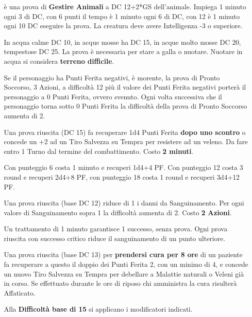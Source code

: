 \documentclass[landscape,10pt,a4paper]{article}
\begin{document}
\begin{multicols}{3}
\begin{dmbox}[title=Gestire Animali - Ammansire un animale]
è una prova di \textbf{Gestire Animali} a DC 12+2*GS dell'animale. Impiega 1 minuto ogni 3 di DC, con 6 punti il tempo è 1 minuto ogni 6 di DC, con 12 è 1 minuto ogni 10 DC eseguire la prova. La creatura deve avere Intelligenza -3 o superiore.
\end{dmbox}		

\begin{dmbox}[title=Nuotare]
In acqua calme DC 10, in acque mosse ha DC 15, in acque molto mosse DC 20, tempestose DC 25. La prova è necessaria per stare a galla o nuotare. Nuotare in acqua si considera \textbf{terreno difficile}.
\end{dmbox}		

\begin{dmbox}[title=Pronto Soccorso]
Se il personaggio ha Punti Ferita negativi, è morente, la prova di Pronto Soccorso, 3 Azioni, a difficoltà 12 più il valore dei Punti Ferita negativi porterà il personaggio a 0 Punti Ferita, ovvero svenuto. Ogni volta successiva che il personaggio torna sotto 0 Punti Ferita la difficoltà della prova di Pronto Soccorso aumenta di 2.

Una prova riuscita (DC 15) fa recuperare 1d4 Punti Ferita \textbf{dopo uno scontro} o concede un +2 ad un Tiro Salvezza su Tempra per resistere ad un veleno. Da fare entro 1 Turno dal termine del combattimento.  Costo \textbf{2 minuti}.

Con punteggio 6 costa 1 minuto e recuperi 1d4+4 PF. Con punteggio 12 costa 3 round e recuperi 2d4+8 PF, con punteggio 18 costa 1 round e recuperi 3d4+12 PF.

Una prova riuscita (base DC 12) riduce di 1 i danni da Sanguinamento. Per ogni valore di Sanguinamento sopra 1 la difficoltà aumenta di 2. Costo \textbf{2 Azioni}.

Un trattamento di 1 minuto garantisce 1 successo, senza prova. Ogni prova riuscita con successo critico riduce il sanguinamento di un punto ulteriore.

Una prova riuscita (base DC 13) per \textbf{prendersi cura per 8 ore} di un paziente fa recuperare a questo il doppio dei Punti Ferita 2, con un minimo di 4, e concede un nuovo Tiro Salvezza su Tempra per debellare a Malattie naturali o Veleni già in corso.
Se effettuato durante le ore di riposo chi amministra la cura risulterà Affaticato.
\end{dmbox}		


\begin{dmbox}[title=Seguire Tracce]
Alla \textbf{Difficoltà base di 15} si applicano i modificatori indicati.\\


\end{dmbox}
\end{multicols}
\end{document}
